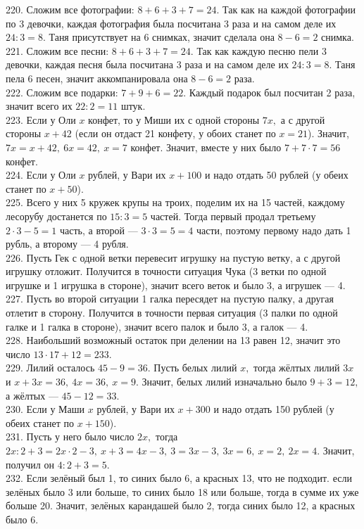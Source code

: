 220. Сложим все фотографии: $8+6+3+7=24.$ Так как на каждой фотографии по 3 девочки, каждая фотография была посчитана 3 раза и на самом деле их $24:3=8.$ Таня присутствует на 6 снимках, значит сделала она $8-6=2$ снимка.\\
221. Сложим все песни: $8+6+3+7=24.$ Так как каждую песню пели 3 девочки, каждая песня была посчитана 3 раза и на самом деле их $24:3=8.$ Таня пела 6 песен, значит аккомпанировала она $8-6=2$ раза.\\
222. Сложим все подарки: $7+9+6=22.$ Каждый подарок был посчитан 2 раза, значит всего их $22:2=11$ штук.\\
223. Если у Оли $x$ конфет, то у Миши их с одной стороны $7x,$ а с другой стороны $x+42$ (если он отдаст 21 конфету, у обоих станет по $x=21$). Значит, $7x=x+42,\ 6x=42,\ x=7$ конфет. Значит, вместе у них было $7+7\cdot7=56$ конфет.\\
224. Если у Оли $x$ рублей, у Вари их $x+100$ и надо отдать 50 рублей (у обеих станет по $x+50$).\\
225. Всего у них 5 кружек крупы на троих, поделим их на 15 частей, каждому лесорубу достанется по $15:3=5$ частей. Тогда первый продал третьему $2\cdot3-5=1$ часть, а второй --- $3\cdot3=5=4$ части, поэтому первому надо дать 1 рубль, а второму --- 4 рубля.\\
226. Пусть Гек с одной ветки перевесит игрушку на пустую ветку, а с другой игрушку отложит. Получится в точности ситуация Чука (3 ветки по одной игрушке и 1 игрушка в стороне), значит всего веток и было 3, а игрушек --- 4.\\
227. Пусть во второй ситуации 1 галка пересядет на пустую палку, а другая отлетит в сторону. Получится в точности первая ситуация (3 палки по одной галке и 1 галка в стороне), значит всего палок и было 3, а галок --- 4.\\
228. Наибольший возможный остаток при делении на 13 равен 12, значит это число $13\cdot17+12=233.$\\
229. Лилий осталось $45-9=36.$ Пусть белых лилий $x,$ тогда жёлтых лилий $3x$ и $x+3x=36,\ 4x=36,\ x=9.$ Значит, белых лилий изначально было $9+3=12,$ а жёлтых --- $45-12=33.$\\
230. Если у Маши $x$ рублей, у Вари их $x+300$ и надо отдать 150 рублей (у обеих станет по $x+150$).\\
231. Пусть у него было число $2x,$ тогда $2x:2+3=2x\cdot2-3,\ x+3=4x-3,\ 3=3x-3,\ 3x=6,\ x=2,\ 2x=4.$ Значит, получил он $4:2+3=5.$\\
232. Если зелёный был 1, то синих было 6, а красных 13, что не подходит. если зелёных было 3 или больше, то синих было 18 или больше, тогда в сумме их уже больше 20. Значит, зелёных карандашей было 2, тогда синих было 12, а красных было 6.\\
